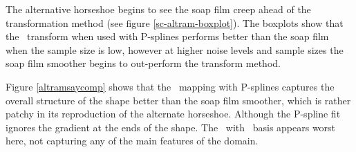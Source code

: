 The alternative horseshoe begins to see the soap film creep ahead of the transformation method (see figure \ref{sc-altram-boxplot}). The boxplots show that the \sch\ transform when used with P-splines performs better than the soap film when the sample size is low, however at higher noise levels and sample sizes the soap film smoother begins to out-perform the transform method.

Figure \ref{altramsaycomp} shows that the \sch\ mapping with P-splines captures the overall structure of the shape better than the soap film smoother, which is rather patchy in its reproduction of the alternate horseshoe. Although the P-spline fit ignores the gradient at the ends of the shape. The \sch\ with \tprs\ basis appears worst here, not capturing any of the main features of the domain.

